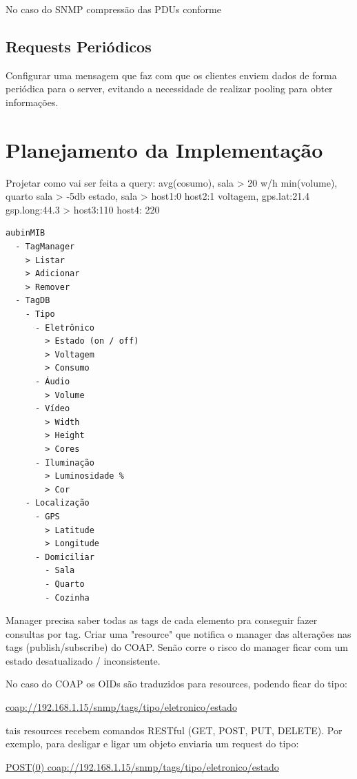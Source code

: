 \documentclass[twoside,english,brazilian]{UNISINOSmonografia}
\begin{document}
		No caso do SNMP compressão das PDUs conforme \cite{Choi2009}
		
		
	\section{Requests Periódicos}
		
		Configurar uma mensagem que faz com que os clientes enviem
		dados de forma periódica para o server, evitando a necessidade
		de realizar pooling para obter informações.
		\cite{Choi2009}
		
		
\chapter{Planejamento da Implementação}

Projetar como vai ser feita a query:
avg(cosumo), 	sala 						> 20 w/h
min(volume), 	quarto sala 				> -5db
estado, 		sala 						> host1:0 host2:1
voltagem, 		gps.lat:21.4 gsp.long:44.3 	> host3:110 host4: 220


\begin{verbatim}
aubinMIB
  - TagManager
    > Listar
    > Adicionar
    > Remover
  - TagDB
    - Tipo
      - Eletrônico
        > Estado (on / off)
        > Voltagem
        > Consumo
      - Áudio
        > Volume
      - Vídeo
        > Width
        > Height
        > Cores
      - Iluminação
        > Luminosidade %
        > Cor
    - Localização
      - GPS
        > Latitude
        > Longitude
      - Domiciliar
        - Sala
        - Quarto
        - Cozinha
\end{verbatim}

Manager precisa saber todas as tags de cada elemento pra conseguir fazer 
consultas por tag. Criar uma "resource" que notifica o manager das alterações 
nas tags (publish/subscribe) do COAP. Senão corre o risco do manager ficar com 
um estado desatualizado / inconsistente.

No caso do COAP os OIDs são traduzidos para resources, podendo ficar do tipo: 

\url{coap://192.168.1.15/snmp/tags/tipo/eletronico/estado}

tais resources recebem comandos RESTful (GET, POST, PUT, DELETE). Por exemplo, 
para desligar e ligar um objeto enviaria um request do tipo:

\url{POST(0) coap://192.168.1.15/snmp/tags/tipo/eletronico/estado}
\end{document}
